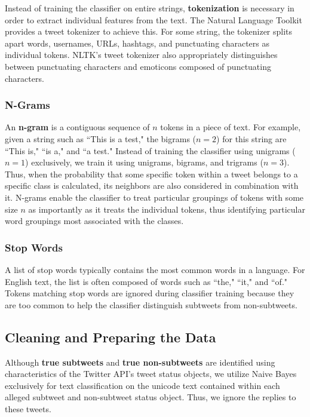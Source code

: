 \documentclass[11pt, twoside, reqno]{book}
\begin{document}
Instead of training the classifier on entire strings, \textbf{tokenization} is necessary in order to extract individual features from the text. The Natural Language Toolkit \cite{nltk} provides a tweet tokenizer to achieve this. For some string, the tokenizer splits apart words, usernames, URLs, hashtags, and punctuating characters as individual tokens. NLTK's tweet tokenizer also appropriately distinguishes between punctuating characters and emoticons composed of punctuating characters.

\subsubsection{N-Grams}
\label{n_grams}

An \textbf{n-gram} is a contiguous sequence of $n$ tokens in a piece of text. For example, given a string such as ``This is a test," the bigrams ($n=2$) for this string are ``This is," ``is a," and ``a test." Instead of training the classifier using unigrams ($n=1$) exclusively, we train it using unigrams, bigrams, and trigrams ($n=3$). Thus, when the probability that some specific token within a tweet belongs to a specific class is calculated, its neighbors are also considered in combination with it. N-grams enable the classifier to treat particular groupings of tokens with some size $n$ as importantly as it treats the individual tokens, thus identifying particular word groupings most associated with the classes.

\subsubsection{Stop Words}
\label{stop_words}

A list of stop words typically contains the most common words in a language. For English text, the list is often composed of words such as ``the," ``it," and ``of." Tokens matching stop words are ignored during classifier training because they are too common to help the classifier distinguish subtweets from non-subtweets. 

\subsection{Cleaning and Preparing the Data}
\label{cleaning_data}

Although \textbf{true subtweets} and \textbf{true non-subtweets} are identified using characteristics of the Twitter API's tweet status objects, we utilize Naive Bayes exclusively for text classification on the unicode text contained within each alleged subtweet and non-subtweet status object. Thus, we ignore the replies to these tweets. 
\end{document}
